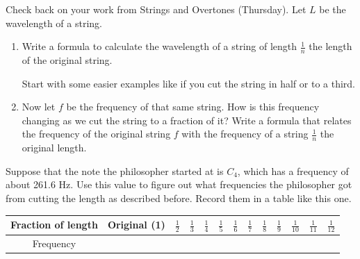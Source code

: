 \documentclass[12pt,noauthor,nooutcomes,hints,instructornotes]{ximera}%
\begin{document}
\begin{question}  Check back on your work from Strings and Overtones (Thursday). Let  $L$ be the wavelength of a string. 

\begin{enumerate}
    \item Write a formula to calculate the wavelength of a string of length $\frac{1}{n}$ the length of the original string.
\begin{hint}
Start with some easier examples like if you cut the string in half or to a third.
\end{hint}

\item Now let $f$ be the frequency of that same string. How is this frequency changing as we cut the string to a fraction of it? Write a formula that relates the frequency of the original string $f$ with the frequency of a string $\frac{1}{n}$ the original length.
  \end{enumerate} 
  \end{question}
\begin{question} Suppose that the note the philosopher started at is $C_4$, which has a frequency of about 261.6 Hz. Use this value to figure out what frequencies the philosopher got from cutting the length as described before. Record them in a table like this one.

\begin{center}
\renewcommand{\arraystretch}{3}
\begin{tabular}{|c|c|c|c|c|c|c|c|c|c|c|c|c|}\hline
Fraction of length & Original (1) & $\frac{1}{2}$ & $\frac{1}{3}$ & $\frac{1}{4}$ & $\frac{1}{5}$  & $\frac{1}{6}$ & $\frac{1}{7}$ & $\frac{1}{8}$ & $\frac{1}{9}$ & $\frac{1}{10}$ & $\frac{1}{11}$ & $\frac{1}{12}$    \\\hline
Frequency & &&&&&&&&&&& \\\hline
\end{tabular}
\end{center}
\end{question}
\end{document}
